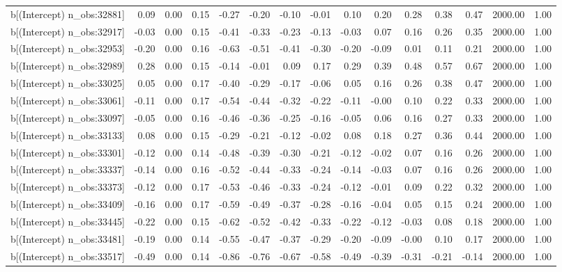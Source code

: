 \begin{table}[ht]
\begin{tabular}{rrrrrrrrrrrrrrr}
  b[(Intercept) n\_obs:32881] & 0.09 & 0.00 & 0.15 & -0.27 & -0.20 & -0.10 & -0.01 & 0.10 & 0.20 & 0.28 & 0.38 & 0.47 & 2000.00 & 1.00 \\ 
  b[(Intercept) n\_obs:32917] & -0.03 & 0.00 & 0.15 & -0.41 & -0.33 & -0.23 & -0.13 & -0.03 & 0.07 & 0.16 & 0.26 & 0.35 & 2000.00 & 1.00 \\ 
  b[(Intercept) n\_obs:32953] & -0.20 & 0.00 & 0.16 & -0.63 & -0.51 & -0.41 & -0.30 & -0.20 & -0.09 & 0.01 & 0.11 & 0.21 & 2000.00 & 1.00 \\ 
  b[(Intercept) n\_obs:32989] & 0.28 & 0.00 & 0.15 & -0.14 & -0.01 & 0.09 & 0.17 & 0.29 & 0.39 & 0.48 & 0.57 & 0.67 & 2000.00 & 1.00 \\ 
  b[(Intercept) n\_obs:33025] & 0.05 & 0.00 & 0.17 & -0.40 & -0.29 & -0.17 & -0.06 & 0.05 & 0.16 & 0.26 & 0.38 & 0.47 & 2000.00 & 1.00 \\ 
  b[(Intercept) n\_obs:33061] & -0.11 & 0.00 & 0.17 & -0.54 & -0.44 & -0.32 & -0.22 & -0.11 & -0.00 & 0.10 & 0.22 & 0.33 & 2000.00 & 1.00 \\ 
  b[(Intercept) n\_obs:33097] & -0.05 & 0.00 & 0.16 & -0.46 & -0.36 & -0.25 & -0.16 & -0.05 & 0.06 & 0.16 & 0.27 & 0.33 & 2000.00 & 1.00 \\ 
  b[(Intercept) n\_obs:33133] & 0.08 & 0.00 & 0.15 & -0.29 & -0.21 & -0.12 & -0.02 & 0.08 & 0.18 & 0.27 & 0.36 & 0.44 & 2000.00 & 1.00 \\ 
  b[(Intercept) n\_obs:33301] & -0.12 & 0.00 & 0.14 & -0.48 & -0.39 & -0.30 & -0.21 & -0.12 & -0.02 & 0.07 & 0.16 & 0.26 & 2000.00 & 1.00 \\ 
  b[(Intercept) n\_obs:33337] & -0.14 & 0.00 & 0.16 & -0.52 & -0.44 & -0.33 & -0.24 & -0.14 & -0.03 & 0.07 & 0.16 & 0.26 & 2000.00 & 1.00 \\ 
  b[(Intercept) n\_obs:33373] & -0.12 & 0.00 & 0.17 & -0.53 & -0.46 & -0.33 & -0.24 & -0.12 & -0.01 & 0.09 & 0.22 & 0.32 & 2000.00 & 1.00 \\ 
  b[(Intercept) n\_obs:33409] & -0.16 & 0.00 & 0.17 & -0.59 & -0.49 & -0.37 & -0.28 & -0.16 & -0.04 & 0.05 & 0.15 & 0.24 & 2000.00 & 1.00 \\ 
  b[(Intercept) n\_obs:33445] & -0.22 & 0.00 & 0.15 & -0.62 & -0.52 & -0.42 & -0.33 & -0.22 & -0.12 & -0.03 & 0.08 & 0.18 & 2000.00 & 1.00 \\ 
  b[(Intercept) n\_obs:33481] & -0.19 & 0.00 & 0.14 & -0.55 & -0.47 & -0.37 & -0.29 & -0.20 & -0.09 & -0.00 & 0.10 & 0.17 & 2000.00 & 1.00 \\ 
  b[(Intercept) n\_obs:33517] & -0.49 & 0.00 & 0.14 & -0.86 & -0.76 & -0.67 & -0.58 & -0.49 & -0.39 & -0.31 & -0.21 & -0.14 & 2000.00 & 1.00 \\ 

\end{tabular}
\end{table}

